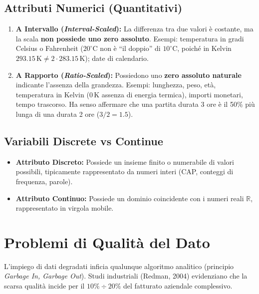 \FloatBarrier
\subsection{Attributi Numerici (Quantitativi)}
\begin{enumerate}
    \item \textbf{A Intervallo (\textit{Interval-Scaled}):} La differenza tra due valori \`e costante, ma la scala \textbf{non possiede uno zero assoluto}. Esempi: temperatura in gradi Celsius o Fahrenheit ($20^\circ\text{C}$ non \`e ``il doppio'' di $10^\circ\text{C}$, poich\'e in Kelvin $293.15\,\text{K} \neq 2 \cdot 283.15\,\text{K}$); date di calendario.
    \item \textbf{A Rapporto (\textit{Ratio-Scaled}):} Possiedono uno \textbf{zero assoluto naturale} indicante l'assenza della grandezza. Esempi: lunghezza, peso, et\`a, temperatura in Kelvin ($0\,\text{K}$ assenza di energia termica), importi monetari, tempo trascorso. Ha senso affermare che una partita durata 3 ore \`e il 50\% pi\`u lunga di una durata 2 ore ($3/2 = 1.5$).
\end{enumerate}

\FloatBarrier
\subsection{Variabili Discrete vs Continue}
\begin{itemize}
    \item \textbf{Attributo Discreto:} Possiede un insieme finito o numerabile di valori possibili, tipicamente rappresentato da numeri interi (CAP, conteggi di frequenza, parole).
    \item \textbf{Attributo Continuo:} Possiede un dominio coincidente con i numeri reali $\mathbb{R}$, rappresentato in virgola mobile.
\end{itemize}

\FloatBarrier
\section{Problemi di Qualit\`a del Dato}

L'impiego di dati degradati inficia qualunque algoritmo analitico (principio \textit{Garbage In, Garbage Out}). Studi industriali (Redman, 2004) evidenziano che la scarsa qualit\`a incide per il $10\%\div 20\%$ del fatturato aziendale complessivo.

